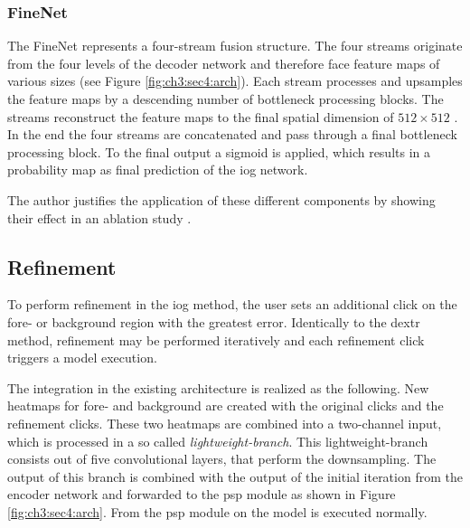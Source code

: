 \subsubsection{FineNet}
The FineNet represents a four-stream fusion structure.
The four streams originate from the four levels of the decoder network and therefore face feature maps of various sizes (see Figure \ref{fig:ch3:sec4:arch}).
Each stream processes and upsamples the feature maps by a descending number of bottleneck processing blocks.
The streams reconstruct the feature maps to the final spatial dimension of $512 \times 512$ .
In the end the four streams are concatenated and pass through a final bottleneck processing block.
To the final output a sigmoid is applied, which results in a probability map as final prediction of the \gls{iog} network.

The author justifies the application of these different components by showing their effect in an ablation study \cite{Zha20-IOG}.


\subsection{Refinement}\label{ord:ch3:sec4:subsec4}

To perform refinement in the \gls{iog} method, the user sets an additional click on the fore- or background region with the greatest error.
Identically to the \gls{dextr} method, refinement may be performed iteratively and each refinement click triggers a model execution.

The integration in the existing architecture is realized as the following.
New heatmaps for fore- and background are created with the original clicks and the refinement clicks.
These two heatmaps are combined into a two-channel input, which is processed in a so called \textit{lightweight-branch}.
This lightweight-branch consists out of five convolutional layers, that perform the downsampling.
The output of this branch is combined with the output of the initial iteration from the encoder network and forwarded to the \gls{psp} module as shown in Figure \ref{fig:ch3:sec4:arch}.
From the \gls{psp} module on the model is executed normally.

